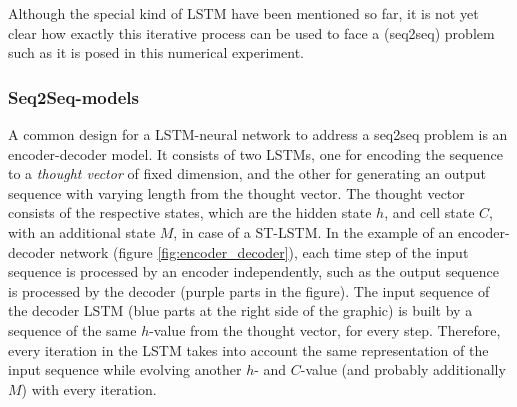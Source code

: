 


Although the special kind of LSTM have been mentioned so far, it is not yet clear how exactly this iterative process can be used to face a (seq2seq) problem such as it is posed in this numerical experiment.

\subsubsection{Seq2Seq-models} \label{cap:seq2seq}
A common design for a LSTM-neural network to address a seq2seq problem is an encoder-decoder model. It consists of two LSTMs, one for encoding the sequence to a \textit{thought vector} of fixed dimension, and the other for generating an output sequence with varying length from the thought vector. The thought vector consists of the respective states, which are the hidden state $h$, and cell state $C$, with an additional state $M$, in case of a ST-LSTM. In the example of an encoder-decoder network (figure \ref{fig:encoder_decoder}), each time step of the input sequence is processed by an encoder independently, such as the output sequence is processed by the decoder (purple parts in the figure). The input sequence of the decoder LSTM (blue parts at the right side of the graphic) is built by a sequence of the same $h$-value from the thought vector, for every step. Therefore, every iteration in the LSTM takes into account the same representation of the input sequence while evolving another $h$- and $C$-value (and probably additionally $M$) with every iteration.

